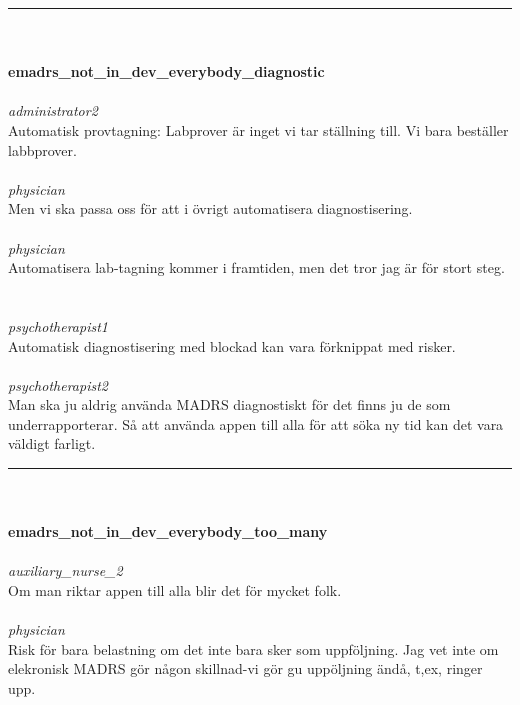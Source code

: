 \documentclass[12pt,a4paper,oneside]{article}
\begin{document}
\hrule
\ \\\ \\{\bf emadrs\_not\_in\_dev\_everybody\_diagnostic }
\\\ \\%
 { \it administrator2 %
}\\ 
Automatisk provtagning: Labprover {\"a}r inget vi tar st{\"a}llning till. Vi bara best{\"a}ller labbprover. %
\ \\\ \\
 { \it   physician %
}\\ 
Men vi ska passa oss f{\"o}r att i {\"o}vrigt automatisera diagnostisering.  %
\ \\\ \\
 { \it   physician %
}\\ 
Automatisera lab-tagning kommer i framtiden, men det tror jag {\"a}r f{\"o}r stort steg. %
\ \\\ \\
 { \it   psychotherapist1 %
}\\ 
Automatisk diagnostisering med blockad kan vara f{\"o}rknippat med risker. %
\ \\\ \\
 { \it   psychotherapist2 %
}\\ 
Man ska ju aldrig anv{\"a}nda MADRS diagnostiskt f{\"o}r det finns ju de som underrapporterar. S{\aa} att anv{\"a}nda appen till alla f{\"o}r att s{\"o}ka ny tid kan det vara v{\"a}ldigt farligt. %


\hrule
\ \\\ \\{\bf emadrs\_not\_in\_dev\_everybody\_too\_many }
\\\ \\%
 { \it auxiliary\_nurse\_2 %
}\\ 
Om man riktar appen till alla blir det f{\"o}r mycket folk. %
\ \\\ \\
 { \it   physician %
}\\ 
Risk f{\"o}r bara belastning om det inte bara sker som uppf{\"o}ljning. Jag vet inte om elekronisk MADRS g{\"o}r n{\aa}gon skillnad-vi g{\"o}r gu upp{\"o}ljning {\"a}nd{\aa}, t,ex, ringer upp. %
\end{document}
